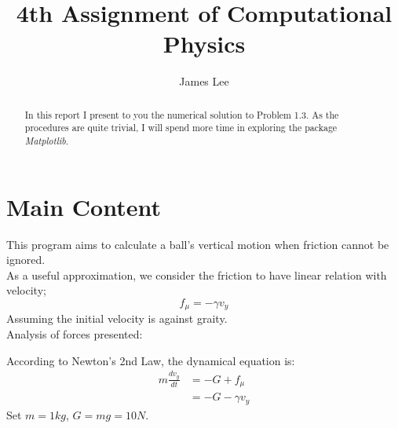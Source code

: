 \documentclass[10pt,a4paper]{article}
\author{James Lee}
\title{4th Assignment of Computational Physics}
\begin{document}
	\maketitle
	\begin{abstract}
		In this report I present to you the numerical solution to Problem 1.3. As the procedures are quite trivial, I will spend more time in exploring the package \emph{Matplotlib}.
	\end{abstract}
	\section{Main Content}
	This program aims to calculate a ball's vertical motion when friction cannot be ignored.\\
	As a useful approximation, we consider the friction to have linear relation with velocity;
	\begin{equation}
    f_{\mu}=-\gamma v_{y}
	\end{equation}
	Assuming the initial velocity is against graity.\\
	Analysis of forces presented:\\
	\begin{center}
	\end{center}
	According to Newton's 2nd Law, the dynamical equation is:
	\begin{align}
	m\frac{dv_y}{dt}&=-G+f_{\mu} \nonumber \\
	                &=-G-\gamma v_y
	\end{align}
	Set $m=1kg$, $G=mg=10N$.
\end{document}
